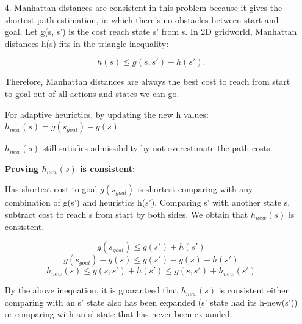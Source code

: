 \documentclass{article}
\begin{document}
\begin{enumerate}
\begin{enumerate}
            \item[4. ] Manhattan distances are consistent in this problem because it gives the shortest path estimation, in which there's no obstacles between start and goal.
            Let g(s, s') is the cost reach state s' from s. In 2D gridworld, Manhattan distances h(s) fits in the triangle inequality: 
            
            \[h(s) \leq g(s, s') + h(s'). \]
            
            Therefore, Manhattan distances are always the best cost to reach from start to goal out of all actions and states we can go.

            For adaptive heurictics, by updating the new h values: 
            $h_{new}(s) = g(s_{goal}) - g(s)$ \par

            $h_{new}(s)$ still satisfies admissibility by not overestimate the path costs.

            \textbf{Proving $h_{new}(s)$ is consistent:} \par
            Has shortest cost to goal $g(s_{goal})$ is shortest comparing with any combination of g(s') and heuristics h(s'). Comparing s' with another state s, subtract cost to reach s from start by both sides. We obtain that $h_{new}(s)$ is consistent.
            
            \[g(s_{goal}) \leq g(s') + h(s') \] 
            \[g(s_{goal}) - g(s) \leq g(s') - g(s) + h(s') \] 
            \[h_{new}(s) \leq g(s,s') + h(s') \leq g(s,s') + h_{new}(s') \]         

            By the above inequation, it is guaranteed that $h_{new}(s)$ is consistent either comparing with an s' state also has been expanded (s' state had its h-new(s')) or comparing with an s' state that has never been expanded.
                
            
        \end{enumerate}
    \end{enumerate}
\end{document}
